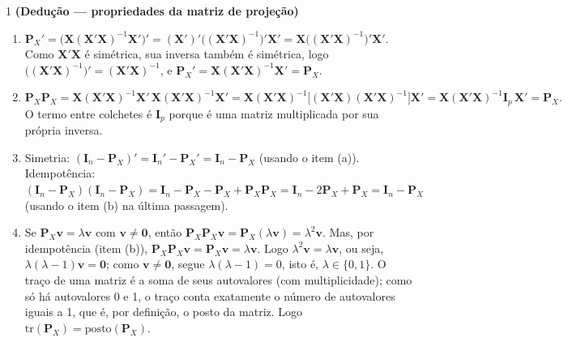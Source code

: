 \documentclass[11pt]{article}
\begin{document}

\begin{questao}{1} \textbf{(Dedução --- propriedades da matriz de projeção)}
\end{questao}
\begin{solucao}
\begin{enumerate}[label=(\alph*)]
  \item $\mathbf{P}_X' = \big(\mathbf{X}(\mathbf{X}'\mathbf{X})^{-1}\mathbf{X}'\big)' =
    (\mathbf{X}')'\big((\mathbf{X}'\mathbf{X})^{-1}\big)'\mathbf{X}' =
    \mathbf{X}\big((\mathbf{X}'\mathbf{X})^{-1}\big)'\mathbf{X}'$. Como $\mathbf{X}'\mathbf{X}$ é
    simétrica, sua inversa também é simétrica, logo $\big((\mathbf{X}'\mathbf{X})^{-1}\big)' =
    (\mathbf{X}'\mathbf{X})^{-1}$, e $\mathbf{P}_X' = \mathbf{X}(\mathbf{X}'\mathbf{X})^{-1}\mathbf{X}' =
    \mathbf{P}_X$.
  \item
  $$
  \mathbf{P}_X\mathbf{P}_X = \mathbf{X}(\mathbf{X}'\mathbf{X})^{-1}\mathbf{X}'\,\mathbf{X}(\mathbf{X}'\mathbf{X})^{-1}\mathbf{X}'
  = \mathbf{X}(\mathbf{X}'\mathbf{X})^{-1}\big[(\mathbf{X}'\mathbf{X})(\mathbf{X}'\mathbf{X})^{-1}\big]\mathbf{X}'
  = \mathbf{X}(\mathbf{X}'\mathbf{X})^{-1}\mathbf{I}_p\,\mathbf{X}' = \mathbf{P}_X.
  $$
  O termo entre colchetes é $\mathbf{I}_p$ porque é uma matriz multiplicada por sua própria
  inversa.
  \item Simetria: $(\mathbf{I}_n-\mathbf{P}_X)' = \mathbf{I}_n' - \mathbf{P}_X' = \mathbf{I}_n -
    \mathbf{P}_X$ (usando o item (a)). Idempotência:
    $(\mathbf{I}_n-\mathbf{P}_X)(\mathbf{I}_n-\mathbf{P}_X) = \mathbf{I}_n - \mathbf{P}_X -
    \mathbf{P}_X + \mathbf{P}_X\mathbf{P}_X = \mathbf{I}_n - 2\mathbf{P}_X + \mathbf{P}_X =
    \mathbf{I}_n - \mathbf{P}_X$ (usando o item (b) na última passagem).
  \item Se $\mathbf{P}_X\mathbf{v} = \lambda\mathbf{v}$ com $\mathbf{v}\neq\mathbf{0}$, então
    $\mathbf{P}_X\mathbf{P}_X\mathbf{v} = \mathbf{P}_X(\lambda\mathbf{v}) = \lambda^2\mathbf{v}$.
    Mas, por idempotência (item (b)), $\mathbf{P}_X\mathbf{P}_X\mathbf{v} = \mathbf{P}_X\mathbf{v}
    = \lambda\mathbf{v}$. Logo $\lambda^2\mathbf{v} = \lambda\mathbf{v}$, ou seja,
    $\lambda(\lambda-1)\mathbf{v}=\mathbf{0}$; como $\mathbf{v}\neq\mathbf{0}$, segue
    $\lambda(\lambda-1)=0$, isto é, $\lambda \in \{0,1\}$. O traço de uma matriz é a soma de seus
    autovalores (com multiplicidade); como só há autovalores 0 e 1, o traço conta exatamente o
    número de autovalores iguais a 1, que é, por definição, o posto da matriz. Logo
    $\mathrm{tr}(\mathbf{P}_X) = \mathrm{posto}(\mathbf{P}_X)$.
\end{enumerate}
\end{solucao}
\end{document}

